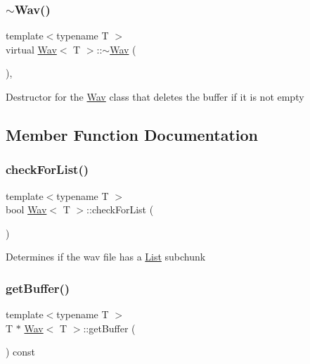 \subsubsection{\texorpdfstring{$\sim$\+Wav()}{~Wav()}}
{\footnotesize\ttfamily template$<$typename T $>$ \\
virtual \hyperlink{classWav}{Wav}$<$ T $>$\+::$\sim$\hyperlink{classWav}{Wav} (\begin{DoxyParamCaption}{ }\end{DoxyParamCaption})\hspace{0.3cm}{\ttfamily [inline]}, {\ttfamily [virtual]}}

Destructor for the \hyperlink{classWav}{Wav} class that deletes the buffer if it is not empty 

\subsection{Member Function Documentation}
\mbox{\label{classWav_ae484d2f0d2ce244ed23b99be6ea43977}} 
\subsubsection{\texorpdfstring{check\+For\+List()}{checkForList()}}
{\footnotesize\ttfamily template$<$typename T $>$ \\
bool \hyperlink{classWav}{Wav}$<$ T $>$\+::check\+For\+List (\begin{DoxyParamCaption}{ }\end{DoxyParamCaption})}

Determines if the wav file has a \hyperlink{structList}{List} subchunk \mbox{\label{classWav_adc3bc9bcc037ff83bc7544715e70e144}} 
\subsubsection{\texorpdfstring{get\+Buffer()}{getBuffer()}}
{\footnotesize\ttfamily template$<$typename T $>$ \\
T $\ast$ \hyperlink{classWav}{Wav}$<$ T $>$\+::get\+Buffer (\begin{DoxyParamCaption}{ }\end{DoxyParamCaption}) const}

